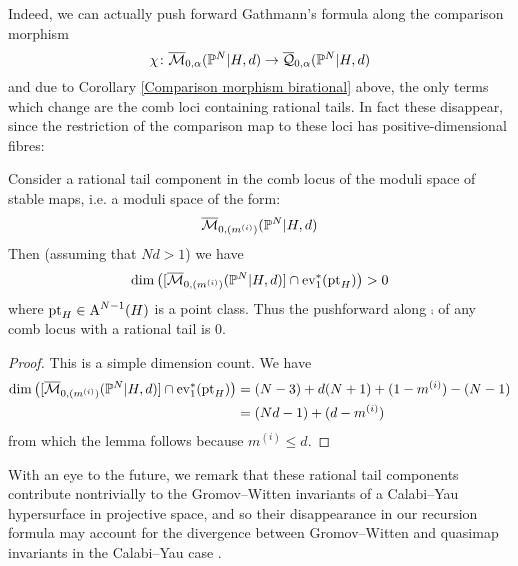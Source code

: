 Indeed, we can actually push forward Gathmann's formula along the comparison morphism
\begin{equation*} \chi \colon \overline{\mathcal M}_{0,\alpha}(\mathbb P^N|H,d)\rightarrow\overline{\mathcal Q}_{0,\alpha}(\mathbb P^N|H,d) \end{equation*}
and due to Corollary \ref{Comparison morphism birational} above, the only terms which change are the comb loci containing rational tails. In fact these disappear, since the restriction of the comparison map to these loci has positive-dimensional fibres:
\begin{lem}\label{lem:posdimfiber} Consider a rational tail component in the comb locus of the moduli space of stable maps, i.e. a moduli space of the form:
\begin{equation*} \overline{\mathcal M}_{0,(m^{(i)})}(\mathbb P^N|H,d) \end{equation*}
Then (assuming that $Nd > 1$) we have
\begin{equation*} \dim \left( [\overline{\mathcal M}_{0,(m^{(i)})}(\mathbb P^N|H,d)] \cap \operatorname{ev}_1^*(\operatorname{pt}_H) \right) > 0 \end{equation*}
where $\operatorname{pt}_H \in \operatorname{A}^{N-1}(H)$ is a point class. Thus the pushforward along $\comp$ of any comb locus with a rational tail is $0$.
\end{lem}
\begin{proof} This is a simple dimension count. We have
\begin{align*} \dim \left( [\overline{\mathcal M}_{0,(m^{(i)})}(\mathbb P^N|H,d)] \cap \operatorname{ev}_1^*(\operatorname{pt}_H) \right) & =(N-3)+d(N+1)+(1-m^{(i)})-(N-1) \\
& =(Nd-1)+(d-m^{(i)})
\end{align*}
from which the lemma follows because $m^{(i)} \leq d$.
\end{proof}
\begin{remark} With an eye to the future, we remark that these rational tail components contribute nontrivially to the Gromov--Witten invariants of a Calabi--Yau hypersurface in projective space, and so their disappearance in our recursion formula may account for the divergence between Gromov--Witten and quasimap invariants in the Calabi--Yau case \cite[Rmk. 1.6]{Ga-MF}. \end{remark}

